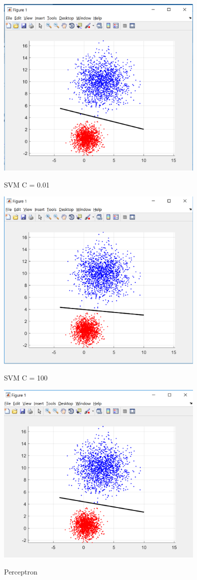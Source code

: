 \documentclass{article}
\begin{document}
\begin{itemize}
\begin{center}
\begin{figure}
\caption{SVM C = 0.01}
\includegraphics[width=100mm,scale=0.3]{svm001}\\
\end{figure}

\begin{figure}
\caption{SVM C = 100}
\includegraphics[width=100mm,scale=0.3]{svm100}\\
\end{figure}

\begin{figure}
\caption{Perceptron}
\includegraphics[width=100mm,scale=0.3]{perceptron}\\
\end{figure}


\end{center}
\end{itemize}
\end{document}
